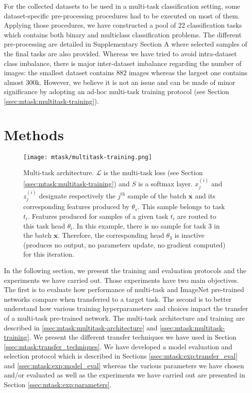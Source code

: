 For the collected datasets to be used in a multi-task classification setting, some dataset-specific pre-processing procedures had to be executed on most of them. Applying those procedures, we have constructed a pool of 22 classification tasks which contains both binary and multiclass classification problems. The different pre-processing are detailed in Supplementary Section A where selected samples of the final tasks are also provided. Whereas we have tried to avoid intra-dataset class imbalance, there is major inter-dataset imbalance regarding the number of images: the smallest dataset contains 882 images whereas the largest one contains almost 300k. However, we believe it is not an issue and can be made of minor significance by adopting an ad-hoc multi-task training protocol (see Section \ref{ssec:mtask:multitask-training}).  

\section{Methods}
\label{sec:mtask:methods}

\begin{figure}
    \centering
    \texttt{[image: mtask/multitask-training.png]}
    \caption{Multi-task architecture. $\mathcal{L}$ is the multi-task loss (see Section \ref{ssec:mtask:multitask-training}) and $S$ is a softmax layer. $x_j^{(i)}$ and $z_j^{(i)}$ designate respectively the $j^{\text{th}}$ sample of the batch $\mathbf{x}$ and its corresponding features produced by $\theta_s$. This sample belongs to task $t_i$. Features produced for samples of a given task $t_i$ are routed to this task head $\theta_i$. In this example, there is no sample for task 3 in the batch $\mathbf{x}$. Therefore, the corresponding head $\theta_3$ is inactive (\ie produces no output, no parameters update, no gradient computed) for this iteration.}
    \label{fig:mtask:multitask-training}
\end{figure}

In the following section, we present the training and evaluation protocols and the experiments we have carried out. Those experiments have two main objectives. The first is to evaluate how performance of multi-task and ImageNet pre-trained networks compare when transferred to a target task. The second is to better understand how various training hyperparameters and choices impact the transfer of a multi-task pre-trained network. The multi-task architecture and training are described in \ref{ssec:mtask:multitask-architecture} and \ref{ssec:mtask:multitask-training}. We present the different transfer techniques we have used in Section \ref{ssec:mtask:transfer_techniques}. We have developed a model evaluation and selection protocol which is described in Sections \ref{ssec:mtask:exp:transfer_eval} and \ref{ssec:mtask:exp:model_eval} whereas the various parameters we have chosen and/or evaluated as well as the experiments we have carried out are presented in Section \ref{ssec:mtask:exp:parameters}. 

